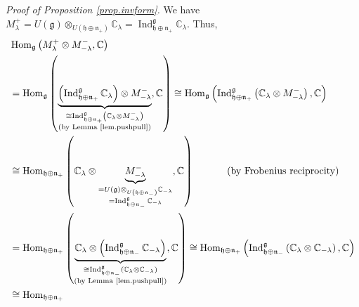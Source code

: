 \documentclass
[numbers=enddot,12pt,final,onecolumn,german,notitlepage]{scrartcl}%
\theoremstyle{definition}
\begin{document}
\textit{Proof of Proposition \ref{prop.invform}.} We have $M_{\lambda}%
^{+}=U\left(  \mathfrak{g}\right)  \otimes_{U\left(  \mathfrak{h}%
\oplus\mathfrak{n}_{+}\right)  }\mathbb{C}_{\lambda}=\operatorname*{Ind}%
\nolimits_{\mathfrak{h}\oplus\mathfrak{n}_{+}}^{\mathfrak{g}}\mathbb{C}%
_{\lambda}$. Thus,%
\begin{align*}
&  \operatorname*{Hom}\nolimits_{\mathfrak{g}}\left(  M_{\lambda}^{+}\otimes
M_{-\lambda}^{-},\mathbb{C}\right) \\
&  =\operatorname*{Hom}\nolimits_{\mathfrak{g}}\left(  \underbrace{\left(
\operatorname*{Ind}\nolimits_{\mathfrak{h}\oplus\mathfrak{n}_{+}%
}^{\mathfrak{g}}\mathbb{C}_{\lambda}\right)  \otimes M_{-\lambda}^{-}%
}_{\substack{\cong\operatorname*{Ind}\nolimits_{\mathfrak{h}\oplus
\mathfrak{n}_{+}}^{\mathfrak{g}}\left(  \mathbb{C}_{\lambda}\otimes
M_{-\lambda}^{-}\right)  \\\text{(by Lemma \ref{lem.pushpull})}}%
},\mathbb{C}\right)  \cong\operatorname*{Hom}\nolimits_{\mathfrak{g}}\left(
\operatorname*{Ind}\nolimits_{\mathfrak{h}\oplus\mathfrak{n}_{+}%
}^{\mathfrak{g}}\left(  \mathbb{C}_{\lambda}\otimes M_{-\lambda}^{-}\right)
,\mathbb{C}\right) \\
&  \cong\operatorname*{Hom}\nolimits_{\mathfrak{h}\oplus\mathfrak{n}_{+}%
}\left(  \mathbb{C}_{\lambda}\otimes\underbrace{M_{-\lambda}^{-}%
}_{\substack{=U\left(  \mathfrak{g}\right)  \otimes_{U\left(  \mathfrak{h}%
\oplus\mathfrak{n}_{-}\right)  }\mathbb{C}_{-\lambda}\\=\operatorname*{Ind}%
\nolimits_{\mathfrak{h}\oplus\mathfrak{n}_{-}}^{\mathfrak{g}}\mathbb{C}%
_{-\lambda}}},\mathbb{C}\right)  \ \ \ \ \ \ \ \ \ \ \left(  \text{by
Frobenius reciprocity}\right) \\
&  =\operatorname*{Hom}\nolimits_{\mathfrak{h}\oplus\mathfrak{n}_{+}}\left(
\underbrace{\mathbb{C}_{\lambda}\otimes\left(  \operatorname*{Ind}%
\nolimits_{\mathfrak{h}\oplus\mathfrak{n}_{-}}^{\mathfrak{g}}\mathbb{C}%
_{-\lambda}\right)  }_{\substack{\cong\operatorname*{Ind}%
\nolimits_{\mathfrak{h}\oplus\mathfrak{n}_{-}}^{\mathfrak{g}}\left(
\mathbb{C}_{\lambda}\otimes\mathbb{C}_{-\lambda}\right)  \\\text{(by Lemma
\ref{lem.pushpull})}}},\mathbb{C}\right)  \cong\operatorname*{Hom}%
\nolimits_{\mathfrak{h}\oplus\mathfrak{n}_{+}}\left(  \operatorname*{Ind}%
\nolimits_{\mathfrak{h}\oplus\mathfrak{n}_{-}}^{\mathfrak{g}}\left(
\mathbb{C}_{\lambda}\otimes\mathbb{C}_{-\lambda}\right)  ,\mathbb{C}\right) \\
&  \cong\operatorname*{Hom}\nolimits_{\mathfrak{h}\oplus\mathfrak{n}_{+}%
}
\end{align*}
\end{document}
